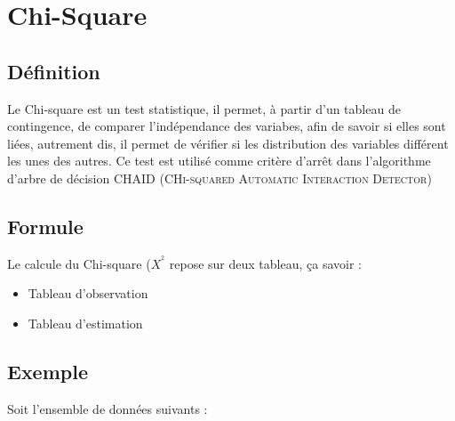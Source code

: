 \documentclass[a4paper, 11pt]{report}
\begin{document}
\chapter{Chi-Square}

\section{Définition}
Le Chi-square est un test statistique, il permet, à partir d'un tableau de contingence, de comparer l'indépendance des variabes, afin de savoir si elles sont liées, autrement dis, il permet de vérifier si les distribution des variables différent les unes des autres.
Ce test est utilisé comme critère d'arrêt dans l'algorithme d'arbre de décision CHAID (\textsc{CHi-squared Automatic Interaction Detector)}
\section{Formule}
Le calcule du Chi-square ($X^^2$ repose sur deux tableau, ça savoir :
\begin{itemize}
\item Tableau d'observation 
\item Tableau d'estimation 
\end{itemize}

\section{Exemple}
Soit l'ensemble de données suivants :
\end{document}
